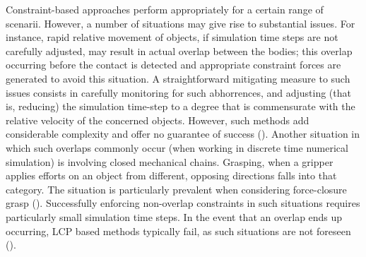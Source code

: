 Constraint-based approaches perform appropriately for a certain range of scenarii. However, a number of situations may give rise to substantial issues. For instance, rapid relative movement of objects, if simulation time steps are not carefully adjusted, may result in actual overlap between the bodies; this overlap occurring before the contact is detected and appropriate constraint forces are generated to avoid this situation. A straightforward mitigating measure to such issues consists in carefully monitoring for such abhorrences, and adjusting (that is, reducing) the simulation time-step to a degree that is commensurate with the relative velocity of the concerned objects. However, such methods add considerable complexity and offer no guarantee of success (\cite{engine_simulation}). Another situation in which such overlaps commonly occur (when working in discrete time numerical simulation) is involving closed mechanical chains. Grasping, when a gripper applies efforts on an object from different, opposing directions falls into that category. The situation is particularly prevalent when considering force-closure grasp (\cite{nguyen1988constructing}). Successfully enforcing non-overlap constraints in such situations requires particularly small simulation time steps. In the event that an overlap ends up occurring, LCP based methods typically fail, as such situations are not foreseen (\cite{baraff_analytical}).

